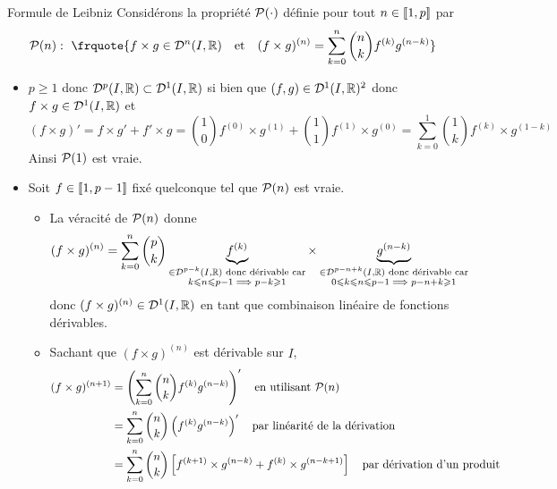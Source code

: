 \documentclass{article}
\renewenvironment{question_kholle}[2][ ]
{
	\subsection{\texorpdfstring{#2}{}}
	\notblank{#1}
	{
		\noindent #1
		\bigbreak
	}
	{}
	\begin{proof}
}
{
	\end{proof}
}
\begin{document}
\begin{question_kholle}{Formule de Leibniz}
	Considérons la propriété $\mathcal P(\cdot)$ définie pour tout $n\in[\![ 1,p ]\!]$ par
	\[
		\prop(n):~\frquote{f\times g \in \mathcal{D}^{n}(I,\R) \quad\text{et}\quad (f\times g)^{(n)}=\sum_{k=0}^{n}\binom{n}{k}f^{(k)}g^{(n-k)}}
	\]
	\begin{itemize}[label=$\vartriangleright$]
		\item $p\geq 1$ donc $\mathcal{D}^{p}(I,\mathbb R)\subset \mathcal{D}^{1}(I,\mathbb R)$ si bien que $(f,g)\in \mathcal{D}^{1}(I,\mathbb R)^{2}$ donc $f \times g \in \mathcal{D}^{1}(I,\mathbb R)$ et
		      \[
			      (f \times g)'=f \times g' + f' \times  g = \binom{1}{0}f^{(0)} \times g^{(1)} + \binom{1}{1}f^{(1)} \times g^{(0)} = \sum_{k=0}^{1}\binom{1}{k}f^{(k)} \times g^{(1-k)}
		      \]
		      Ainsi $\mathcal P(1)$ est vraie.
		\item Soit $f\in[\![ 1,p-1 ]\!]$ fixé quelconque tel que $\mathcal P(n)$ est vraie.
		      \begin{itemize}
			      \item La véracité de $\mathcal P(n)$ donne
			            \[
				            (f \times g)^{(n)} = \sum_{k=0}^{n}\binom{p}{k}\underbrace{f^{(k)}}_{\substack{\in \mathcal{D}^{p-k}(I,\mathbb R) \text{ donc dérivable car}\\k\leqslant n\leqslant p-1 \implies p-k\geqslant 1}} \times \underbrace{g^{(n-k)}}_{\substack{\in \mathcal{D}^{p-n+k}(I,\mathbb R) \text{ donc dérivable car}\\0\leqslant k\leqslant n\leqslant p-1 \implies p-n+k\geqslant 1}}
			            \]
			            donc $(f \times g)^{(n)}\in \mathcal{D}^{1}(I,\mathbb R)$ en tant que combinaison linéaire de fonctions dérivables.
			      \item Sachant que $(f \times g)^{(n)}$ est dérivable sur $I$,
			            \begin{align*}
				            (f \times g)^{(n+1)} & = \left(\sum_{k=0}^{n}\binom{n}{k}f^{(k)}g^{(n-k)}\right)' \quad\text{en utilisant } \prop(n)                                                                     \\
				                                 & = \sum_{k=0}^{n}\binom{n}{k}\left(f^{(k)}g^{(n-k)}\right)' \quad\text{par linéarité de la dérivation}                                                             \\
				                                 & = \sum_{k=0}^{n}\binom{n}{k} \left[f^{(k+1)} \times g^{(n-k)} + f^{(k)} \times  g^{(n-k+1)}\right] \quad\text{par dérivation d’un produit}                        \\

\end{align*}
\end{itemize}
\end{itemize}
\end{question_kholle}
\end{document}
